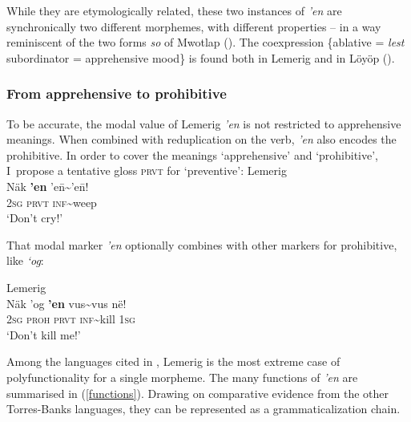 \documentclass[output=paper,colorlinks,citecolor=brown]{langscibook}
\begin{document}
\noindent While they are etymologically related, these two instances of \textit{'en} are synchronically two different morphemes, with different properties -- in a way reminiscent of the two forms  \textit{so} of Mwotlap (). The coexpression \{ablative = \textit{lest} subordinator = apprehensive mood\} is found both in Lemerig and in Löyöp ().



\subsubsection{From apprehensive to prohibitive}
\label{subsubsec:apptoprohib}

To be accurate, the modal value of Lemerig \textit{'en} is not restricted to apprehensive meanings. When combined with reduplication on the verb, \textit{'en} also encodes the prohibitive. In order to cover the meanings `apprehensive' and `prohibitive', I~propose a tentative gloss \textsc{prvt} for `preventive':
\newpage
\ea \label{ex:Fra22} \textnormal{Lemerig}  \\
\gll Näk \textbf{'en} 'e\={n}\textasciitilde'e\={n}!\\
\textsc{2sg} \textsc{prvt} \textsc{inf}\textasciitilde weep \\
\glt `Don't cry!' 
\z

That modal marker \textit{'en} optionally combines with other markers for prohibitive, like \textit{`og}:
 
\ea \label{ex:Fra23} \textnormal{Lemerig}  \\
\gll Näk 'og \textbf{'en} vus\textasciitilde vus në! \\
\textsc{2sg} \textsc{proh} \textsc{prvt} \textsc{inf}\textasciitilde kill \textsc{1sg} \\
\glt `Don't kill me!' 
\z

Among the languages cited in , Lemerig is the most extreme case of polyfunctionality for a single morpheme. The many functions of \textit{'en} are summarised in (\ref{functions}). Drawing on comparative evidence from the other Torres-Banks languages, they can be represented as a grammaticalization chain. 

\end{document}
